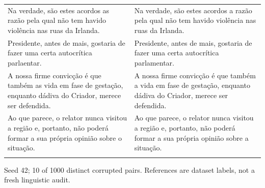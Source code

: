 \documentclass[10pt]{article}
\begin{document}
{\begin{tabular}{@{}>{\raggedright\arraybackslash}p{}@{\hspace{0.04\textwidth}}>{\raggedright\arraybackslash}p{}@{}}
Na verdade, são estes acordos as razão pela qual não tem havido violência nas ruas da Irlanda. & Na verdade, são estes acordos a razão pela qual não tem havido violência nas ruas da Irlanda. \\ \addlinespace[5pt]
Presidente, antes de mais, gostaria de fazer uma certa autocrítica parlaentar. & Presidente, antes de mais, gostaria de fazer uma certa autocrítica parlamentar. \\ \addlinespace[5pt]
A nossa firme convicção é que também as vida em fase de gestação, enquanto dádiva do Criador, merece ser defendida. & A nossa firme convicção é que também a vida em fase de gestação, enquanto dádiva do Criador, merece ser defendida. \\ \addlinespace[5pt]
Ao que parece, o relator nunca visitou a região e, portanto, não poderá formar a sua própria opinião sobre o situação. & Ao que parece, o relator nunca visitou a região e, portanto, não poderá formar a sua própria opinião sobre a situação. \\ \addlinespace[5pt]
\bottomrule\end{tabular}}%
\ifdim\dimexpr\ht\pairtable+\dp\pairtable\relax>0.82\textheight%
\resizebox*{!}{0.82\textheight}{\usebox{\pairtable}}%
\else\usebox{\pairtable}\fi%
\par\smallskip\footnotesize Seed 42; 10 of 1000 distinct corrupted pairs. References are dataset labels, not a fresh linguistic audit.\normalsize
\clearpage
\end{document}
